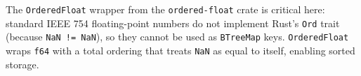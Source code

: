 The \texttt{OrderedFloat} wrapper from the \texttt{ordered-float} crate is critical here: standard IEEE 754 floating-point numbers do not implement Rust's \texttt{Ord} trait (because \texttt{NaN != NaN}), so they cannot be used as \texttt{BTreeMap} keys. \texttt{OrderedFloat} wraps \texttt{f64} with a total ordering that treats \texttt{NaN} as equal to itself, enabling sorted storage.
